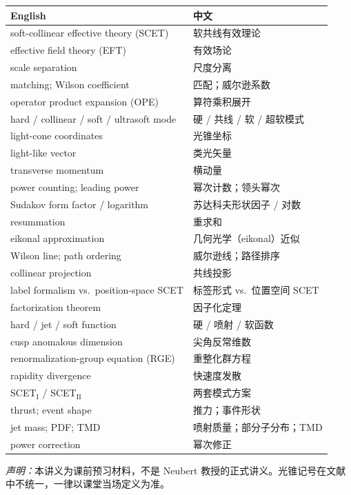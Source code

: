 \documentclass[11pt,a4paper]{article}
\theoremstyle{definition}
\theoremstyle{plain}
\theoremstyle{remark}
\begin{document}
\begin{center}
\begin{tabular}{>{\raggedright\arraybackslash}p{} p{}}
\toprule
\textbf{English} & \textbf{中文} \\
\midrule
soft-collinear effective theory (SCET) & 软共线有效理论 \\
effective field theory (EFT) & 有效场论 \\
scale separation & 尺度分离 \\
matching; Wilson coefficient & 匹配；威尔逊系数 \\
operator product expansion (OPE) & 算符乘积展开 \\
hard / collinear / soft / ultrasoft mode & 硬 / 共线 / 软 / 超软模式 \\
light-cone coordinates & 光锥坐标 \\
light-like vector & 类光矢量 \\
transverse momentum & 横动量 \\
power counting; leading power & 幂次计数；领头幂次 \\
Sudakov form factor / logarithm & 苏达科夫形状因子 / 对数 \\
resummation & 重求和 \\
eikonal approximation & 几何光学（eikonal）近似 \\
Wilson line; path ordering & 威尔逊线；路径排序 \\
collinear projection & 共线投影 \\
label formalism vs.\ position-space SCET & 标签形式 vs.\ 位置空间 SCET \\
factorization theorem & 因子化定理 \\
hard / jet / soft function & 硬 / 喷射 / 软函数 \\
cusp anomalous dimension & 尖角反常维数 \\
renormalization-group equation (RGE) & 重整化群方程 \\
rapidity divergence & 快速度发散 \\
SCET$_{\mathrm I}$ / SCET$_{\mathrm{II}}$ & 两套模式方案 \\
thrust; event shape & 推力；事件形状 \\
jet mass; PDF; TMD & 喷射质量；部分子分布；TMD \\
power correction & 幂次修正 \\
\bottomrule
\end{tabular}
\end{center}

\vspace{1.2em}
\noindent\textit{声明：}本讲义为课前预习材料，不是 Neubert 教授的正式讲义。光锥记号在文献中不统一，一律以课堂当场定义为准。
\end{document}

